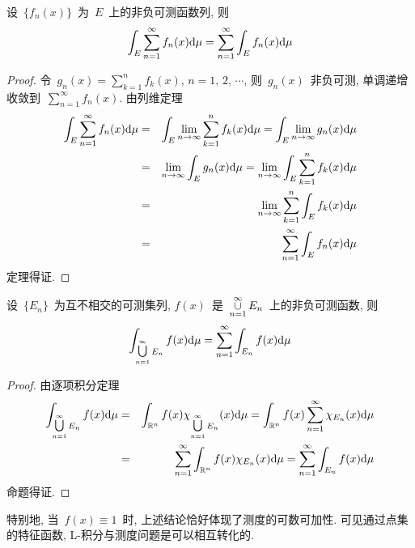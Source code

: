 \begin{theorem}
设~$\{f_n(x)\}$~为~$E$~上的非负可测函数列, 则
\[
\int_E \sum_{n=1}^\infty f_n(x) \mathrm{d} \mu = \sum_{n=1}^\infty \int_E f_n(x) \mathrm{d} \mu
\]
\end{theorem}

\begin{proof}
令~$g_n(x) = \sum\limits_{k=1}^n f_k(x),\, n = 1,\,  2,\, \cdots$, 则~$g_n(x)$~非负可测, 单调递增收敛到~$\sum\limits_{n=1}^\infty f_n(x)$. 由列维定理
\begin{eqnarray*}
\int_E \sum_{n=1}^\infty f_n(x) \mathrm{d} \mu &=& \int_E \lim_{n \to \infty} \sum_{k=1}^n f_k(x) \mathrm{d} \mu = \int_E \lim_{n \to \infty} g_n(x) \mathrm{d} \mu \\
&=& \lim_{n \to \infty} \int_E g_n(x) \mathrm{d} \mu = \lim_{n \to \infty} \int_E \sum\limits_{k=1}^n f_k(x) \mathrm{d} \mu \\
&=& \lim_{n \to \infty} \sum\limits_{k=1}^n \int_E  f_k(x) \mathrm{d} \mu \\
&=& \sum_{n=1}^\infty \int_E f_n(x) \mathrm{d} \mu
\end{eqnarray*}
定理得证.
\end{proof}

\begin{proposition}
设~$\{E_n\}$~为互不相交的可测集列, $f(x)$~是~$\mathop{\mathop{\cup}}\limits_{n=1}^\infty E_n$~上的非负可测函数, 则
\[
\int_{\mathop{\mathop{\textstyle{\bigcup}}}\limits_{n=1}^\infty E_n} f(x) \mathrm{d} \mu = \sum_{n=1}^\infty \int_{E_n} f(x) \mathrm{d} \mu
\]
\end{proposition}

\begin{proof}
由逐项积分定理
\begin{eqnarray*}
\int_{\mathop{\mathop{\textstyle{\bigcup}}}\limits_{n=1}^\infty E_n} f(x) \mathrm{d} \mu &=& \int_{\mathbb{R}^n} f(x) \chi_{\mathop{\mathop{\textstyle{\bigcup}}}\limits_{n=1}^\infty E_n}(x) \mathrm{d} \mu = \int_{\mathbb{R}^n} f(x) \sum_{n=1}^\infty \chi_{E_n}(x) \mathrm{d} \mu \\
&=& \sum_{n=1}^\infty \int_{\mathbb{R}^n} f(x) \chi_{E_n}(x) \mathrm{d} \mu = \sum_{n=1}^\infty \int_{E_n} f(x) \mathrm{d} \mu
\end{eqnarray*}
命题得证.
\end{proof}

\begin{remark}
特别地, 当~$f(x) \equiv 1$~时, 上述结论恰好体现了测度的可数可加性. 可见通过点集的特征函数,
L-积分与测度问题是可以相互转化的.
\end{remark}

